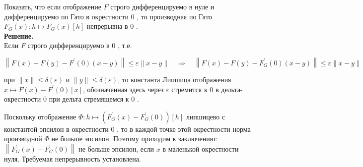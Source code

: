 \begin{task}
    Показать, что если отображение $F$ строго дифференцируемо в нуле и дифференцируемо по Гато в окрестности 0 , то производная по Гато $F_{G}(x): h \mapsto F_{G}(x)[h]$ непрерывна в 0 .\\
    \textbf{Решение.} \\
    Если $F$ строго дифференцируемо в 0 , т.е.
    
    $$
    \left\|F(x)-F(y)-F^{\prime}(0)(x-y)\right\| \leq \varepsilon\|x-y\| \quad \Longrightarrow \quad\left\|F(x)-F(y)-F_{G}^{\prime}(0)(x-y)\right\| \leq \varepsilon\|x-y\|
    $$
    
    при $\|x\| \leq \delta(\varepsilon)$ и $\|y\| \leq \delta(\varepsilon)$, то константа Липшица отображения $x \mapsto F(x)-F^{\prime}(0)[x]$, обозначенная здесь через $\varepsilon$ стремится к 0 в дельта-окрестности 0 при дельта стремящемся к 0 .
    
    Поскольку отображение $\Phi: h \mapsto\left(F_{G}^{\prime}(x)-F_{G}^{\prime}(0)\right)[h]$ липшицево с константой эпсилон в окрестности 0 , то в каждой точке этой окрестности норма производной $\Phi$ не больше эпсилон. Поэтому приходим к заключению: $\left\|F_{G}^{\prime}(x)-F_{G}^{\prime}(0)\right\|$ не больше эпсилон, если $x$ в маленькой окрестности нуля. Требуемая непрерывность установлена.
\end{task}